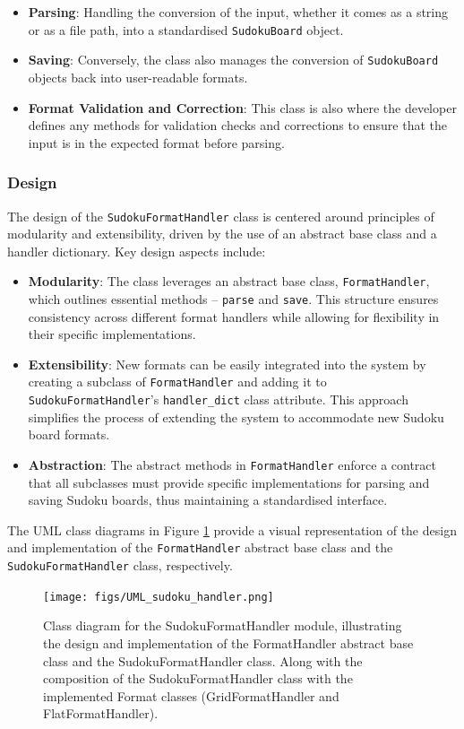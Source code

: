 \documentclass[11pt]{article}
\begin{document}
\begin{itemize}
\item \textbf{Parsing}: Handling the conversion of the input, whether it comes as a string or as a file path, into a standardised \texttt{SudokuBoard} object.

\item \textbf{Saving}: Conversely, the class also manages the conversion of \texttt{SudokuBoard} objects back into user-readable formats. 

\item \textbf{Format Validation and Correction}: This class is also where the developer defines any methods for validation checks and corrections to ensure that the input is in the expected format before parsing.
\end{itemize}

\subsubsection{Design}
The design of the \texttt{SudokuFormatHandler} class is centered around principles of modularity and extensibility, driven by the use of an abstract base class and a handler dictionary. Key design aspects include:

\begin{itemize}
    \item \textbf{Modularity}: The class leverages an abstract base class, \texttt{FormatHandler}, which outlines essential methods -- \texttt{parse} and \texttt{save}. This structure ensures consistency across different format handlers while allowing for flexibility in their specific implementations.
    \item \textbf{Extensibility}: New formats can be easily integrated into the system by creating a subclass of \texttt{FormatHandler} and adding it to \texttt{SudokuFormatHandler}'s \texttt{handler\_dict} class attribute. This approach simplifies the process of extending the system to accommodate new Sudoku board formats.
    \item \textbf{Abstraction}: The abstract methods in \texttt{FormatHandler} enforce a contract that all subclasses must provide specific implementations for parsing and saving Sudoku boards, thus maintaining a standardised interface.
\end{itemize}
The UML class diagrams in Figure \ref{fig:format_handler_uml} provide a visual representation of the design and implementation of the \texttt{FormatHandler} abstract base class and the \texttt{SudokuFormatHandler} class, respectively.
\begin{figure}[H]
    \centering
    \texttt{[image: figs/UML\_sudoku\_handler.png]}
    \caption{Class diagram for the SudokuFormatHandler module, illustrating the design and implementation of the FormatHandler abstract base class and the SudokuFormatHandler class. Along with the composition of the SudokuFormatHandler class with the implemented Format classes (GridFormatHandler and FlatFormatHandler).}
    \label{fig:format_handler_uml}
\end{figure}
\end{document}
